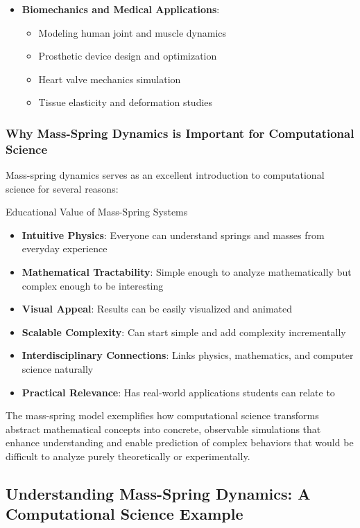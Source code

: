 \begin{itemize}
    \item \textbf{Biomechanics and Medical Applications}:
    \begin{itemize}
        \item Modeling human joint and muscle dynamics
        \item Prosthetic device design and optimization
        \item Heart valve mechanics simulation
        \item Tissue elasticity and deformation studies
    \end{itemize}
\end{itemize}

\subsubsection{Why Mass-Spring Dynamics is Important for Computational Science}

Mass-spring dynamics serves as an excellent introduction to computational science for several reasons:

\begin{highlightbox}{Educational Value of Mass-Spring Systems}
\begin{itemize}
    \item \textbf{Intuitive Physics}: Everyone can understand springs and masses from everyday experience
    \item \textbf{Mathematical Tractability}: Simple enough to analyze mathematically but complex enough to be interesting
    \item \textbf{Visual Appeal}: Results can be easily visualized and animated
    \item \textbf{Scalable Complexity}: Can start simple and add complexity incrementally
    \item \textbf{Interdisciplinary Connections}: Links physics, mathematics, and computer science naturally
    \item \textbf{Practical Relevance}: Has real-world applications students can relate to
\end{itemize}
\end{highlightbox}

The mass-spring model exemplifies how computational science transforms abstract mathematical concepts into concrete, observable simulations that enhance understanding and enable prediction of complex behaviors that would be difficult to analyze purely theoretically or experimentally.

\subsection{Understanding Mass-Spring Dynamics: A Computational Science Example}

